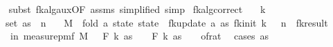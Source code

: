 \begin{isabellebody}
\ \ \isamarkupfalse%
\ {\isacharparenleft}{\kern0pt}subst\ fk{\isacharunderscore}{\kern0pt}alg{\isacharunderscore}{\kern0pt}aux{\isacharunderscore}{\kern0pt}{}{\isacharbrackleft}{\kern0pt}OF\ assms{\isacharparenleft}{\kern0pt}{}{\isacharparenright}{\kern0pt}{\isacharcomma}{\kern0pt}\ simplified{\isacharbrackright}{\kern0pt}{\isacharcomma}{\kern0pt}\ simp{\isacharparenright}{\kern0pt}%
\endisatagproof
{\isafoldproof}%
%
\isadelimproof
\isanewline
%
\endisadelimproof
\isanewline
{}\isamarkupfalse%
\ fk{\isacharunderscore}{\kern0pt}alg{\isacharunderscore}{\kern0pt}correct{\isacharcolon}{\kern0pt}\isanewline
\ \ \ {\isachardoublequoteopen}k\ {\isasymge}\ {}{\isachardoublequoteclose}\isanewline
\ \ \ {\isachardoublequoteopen}{\isasymepsilon}\ {\isasymin}\ {\isacharbraceleft}{\kern0pt}{}{\isacharless}{\kern0pt}{\isachardot}{\kern0pt}{\isachardot}{\kern0pt}{\isacharless}{\kern0pt}{}{\isacharbraceright}{\kern0pt}{\isachardoublequoteclose}\isanewline
\ \ \ {\isachardoublequoteopen}{\isasymdelta}\ {\isachargreater}{\kern0pt}\ {}{\isachardoublequoteclose}\isanewline
\ \ \ {\isachardoublequoteopen}set\ as\ {\isasymsubseteq}\ {\isacharbraceleft}{\kern0pt}{}{\isachardot}{\kern0pt}{\isachardot}{\kern0pt}{\isacharless}{\kern0pt}n{\isacharbraceright}{\kern0pt}{\isachardoublequoteclose}\isanewline
\ \ \ {\isachardoublequoteopen}M\ {\isasymequiv}\ fold\ {\isacharparenleft}{\kern0pt}{\isasymlambda}a\ state{\isachardot}{\kern0pt}\ state\ {\isasymbind}\ fk{\isacharunderscore}{\kern0pt}update\ a{\isacharparenright}{\kern0pt}\ as\ {\isacharparenleft}{\kern0pt}fk{\isacharunderscore}{\kern0pt}init\ k\ {\isasymdelta}\ {\isasymepsilon}\ n{\isacharparenright}{\kern0pt}\ {\isasymbind}\ fk{\isacharunderscore}{\kern0pt}result{\isachardoublequoteclose}\isanewline
\ \ \ {\isachardoublequoteopen}{\isasymP}{\isacharparenleft}{\kern0pt}{\isasymomega}\ in\ measure{\isacharunderscore}{\kern0pt}pmf\ M{\isachardot}{\kern0pt}\ {\isasymbar}{\isasymomega}\ {\isacharminus}{\kern0pt}\ F\ k\ as{\isasymbar}\ {\isasymle}\ {\isasymdelta}\ {\isacharasterisk}{\kern0pt}\ F\ k\ as{\isacharparenright}{\kern0pt}\ {\isasymge}\ {}\ {\isacharminus}{\kern0pt}\ of{\isacharunderscore}{\kern0pt}rat\ {\isasymepsilon}{\isachardoublequoteclose}\isanewline
%
\isadelimproof
%
\endisadelimproof
%
\isatagproof
{}\isamarkupfalse%
\ {\isacharparenleft}{\kern0pt}cases\ {\isachardoublequoteopen}as\ {\isacharequal}{\kern0pt}\ {\isacharbrackleft}{\kern0pt}{\isacharbrackright}{\kern0pt}{\isachardoublequoteclose}{\isacharparenright}{\kern0pt}\isanewline

\end{isabellebody}
